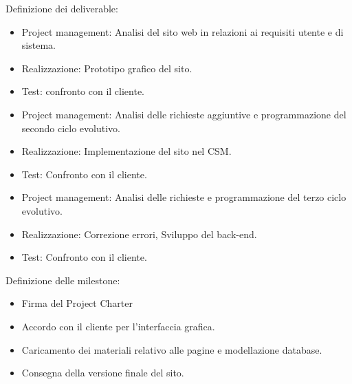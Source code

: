 \documentclass{article}
\begin{document}
	\begin{flushleft}
		
		Definizione dei deliverable:
		
		\begin{itemize}
			
			\item Project management: Analisi del sito web in relazioni ai requisiti utente e di sistema.
			
			\item Realizzazione: Prototipo grafico del sito.
			
			\item Test: confronto con il cliente.
			
			\item Project management: Analisi delle richieste aggiuntive e programmazione del secondo ciclo evolutivo.
			
			\item Realizzazione: Implementazione del sito nel CSM.
			
			\item Test: Confronto con il cliente.
			
			\item Project management: Analisi delle richieste e programmazione del terzo ciclo evolutivo.
			
			\item Realizzazione: Correzione errori, Sviluppo del back-end.
			
			\item Test: Confronto con il cliente.				
			
		\end{itemize}
		
		
		
		Definizione delle milestone:
		
		\begin{itemize}
			
			\item Firma del Project Charter
			
			\item Accordo con il cliente per l'interfaccia grafica.
			
			\item Caricamento dei materiali relativo alle pagine e modellazione database.
			
			\item Consegna della versione finale del sito.
			
		\end{itemize}
		

\end{flushleft}
\end{document}
